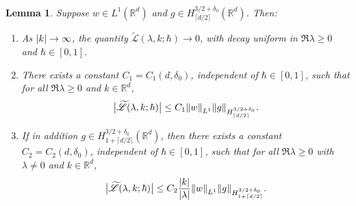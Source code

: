 \documentclass[10pt,a4paper]{article}
\newenvironment{enumeratea}
{\bgroup\def\theenumi{\alph{enumi}}\begin{enumerate}}
{\end{enumerate}\egroup}
\newcommand{\babs}[1]{\bigl|#1\bigr|}
\theoremstyle{plain}
\newtheorem{lemma}[theorem]{Lemma}
\theoremstyle{remark}
\newcommand{\ak}{\abs{k}}
\newcommand{\R}{\mathbb{R}}
\newcommand{\lam}{\lambda}
\newcommand{\ceils}[1]{\lceil#1\rceil}
\begin{document}
\begin{lemma}\label{boundedness and decay lemma}
Suppose $w\in L^1(\R^d)$ and $g\in H^{3/2+\delta_0}_{\ceils{d/2}}(\R^d)$. Then:\vspace*{-3pt}
\begin{enumeratea}
\item \label{(a)} As $\ak\to\infty$, the quantity $\widetilde {\mathscr L}(\lam,k;\hbar)\to0$, with decay uniform in $\Re\lam\geq0$ and $\hbar\in[0,1]$.

\item \label{(b)}There exists a constant $C_1=C_1(d,\delta_0)$, independent of $\hbar\in [0,1]$, such that for all $\Re\lam\geq0$ and $k\in\R^d$,\vspace*{-3pt}
\begin{align*}
\babs{\widetilde {\mathscr L}(\lam,k;\hbar)}\leq C_1\norm{w}_{L^1}\norm{g}_{H^{3/2+\delta_0}_{\ceils{d/2}}}.
\end{align*}
\item \label{(c)} If in addition $g\in H^{3/2+\delta_0}_{1+\ceils{d/2}}(\R^d)$, then there exists a constant $C_2=C_2(d,\delta_0)$, independent of $\hbar\in [0,1]$, such that for all $\Re\lam\geq0$ with $\lam\neq0$ and $k\in\R^d$,\vspace*{-3pt}
\begin{align*}
\babs{\widetilde {\mathscr L}(\lam,k;\hbar)}\leq C_2\frac{\ak}{\abs{\lam}}\norm{w}_{L^1}\norm{g}_{H^{3/2+\delta_0}_{1+\ceils{d/2}}}.
\end{align*}
\end{enumeratea}
\end{lemma}
\end{document}
